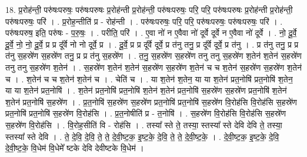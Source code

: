 \documentclass[17pt]{extarticle}
\begin{document}
18. प्र॒रोह॑न्ती॒ परु॑षःपरुषः॒ परु॑षःपरुषः प्र॒रोह॑न्ती प्र॒रोह॑न्ती॒ परु॑षःपरुषः॒ परि॒ परि॒ परु॑षःपरुषः प्र॒रोह॑न्ती प्र॒रोह॑न्ती॒ परु॑षःपरुषः॒ परि॑ । . प्र॒रोह॒न्तीति॑ प्र - रोह॑न्ती । . परु॑षःपरुषः॒ परि॒ परि॒ परु॑षःपरुषः॒ परु॑षःपरुषः॒ परि॑ । . परु॑षःपरुष॒ इति॒ परु॑षः - प॒रु॒षः॒ । . परीति॒ परि॑ । . ए॒वा नो॑ न ए॒वैवा नो॑ दूर्वे दूर्वे न ए॒वैवा नो॑ दूर्वे । . नो॒ दू॒र्वे॒ दू॒र्वे॒ नो॒ नो॒ दू॒र्वे॒ प्र प्र दू᳚र्वे नो नो दूर्वे॒ प्र । . दू॒र्वे॒ प्र प्र दू᳚र्वे दूर्वे॒ प्र त॑नु तनु॒ प्र दू᳚र्वे दूर्वे॒ प्र त॑नु । . प्र त॑नु तनु॒ प्र प्र त॑नु स॒हस्रे॑ण स॒हस्रे॑ण तनु॒ प्र प्र त॑नु स॒हस्रे॑ण । . त॒नु॒ स॒हस्रे॑ण स॒हस्रे॑ण तनु तनु स॒हस्रे॑ण श॒तेन॑ श॒तेन॑ स॒हस्रे॑ण तनु तनु स॒हस्रे॑ण श॒तेन॑ । . स॒हस्रे॑ण श॒तेन॑ श॒तेन॑ स॒हस्रे॑ण स॒हस्रे॑ण श॒तेन॑ च च श॒तेन॑ स॒हस्रे॑ण स॒हस्रे॑ण श॒तेन॑ च । . श॒तेन॑ च च श॒तेन॑ श॒तेन॑ च । . चेति॑ च । . या श॒तेन॑ श॒तेन॒ या या श॒तेन॑ प्रत॒नोषि॑ प्रत॒नोषि॑ श॒तेन॒ या या श॒तेन॑ प्रत॒नोषि॑ । . श॒तेन॑ प्रत॒नोषि॑ प्रत॒नोषि॑ श॒तेन॑ श॒तेन॑ प्रत॒नोषि॑ स॒हस्रे॑ण स॒हस्रे॑ण प्रत॒नोषि॑ श॒तेन॑ श॒तेन॑ प्रत॒नोषि॑ स॒हस्रे॑ण । . प्र॒त॒नोषि॑ स॒हस्रे॑ण स॒हस्रे॑ण प्रत॒नोषि॑ प्रत॒नोषि॑ स॒हस्रे॑ण वि॒रोह॑सि वि॒रोह॑सि स॒हस्रे॑ण प्रत॒नोषि॑ प्रत॒नोषि॑ स॒हस्रे॑ण वि॒रोह॑सि । . प्र॒त॒नोषीति॑ प्र - त॒नोषि॑ । . स॒हस्रे॑ण वि॒रोह॑सि वि॒रोह॑सि स॒हस्रे॑ण स॒हस्रे॑ण वि॒रोह॑सि । . वि॒रोह॒सीति॑ वि - रोह॑सि । . तस्या᳚ स्ते ते॒ तस्या॒ स्तस्या᳚ स्ते देवि देवि ते॒ तस्या॒ स्तस्या᳚ स्ते देवि । . ते॒ दे॒वि॒ दे॒वि॒ ते॒ ते॒ दे॒वी॒ष्ट॒क॒ इ॒ष्ट॒के॒ दे॒वि॒ ते॒ ते॒ दे॒वी॒ष्ट॒के॒ । . दे॒वी॒ष्ट॒क॒ इ॒ष्ट॒के॒ दे॒वि॒ दे॒वी॒ष्ट॒के॒ वि॒धेम॑ वि॒धेमे᳚ ष्टके देवि देवीष्टके वि॒धेम॑ । \newline
\end{document}
